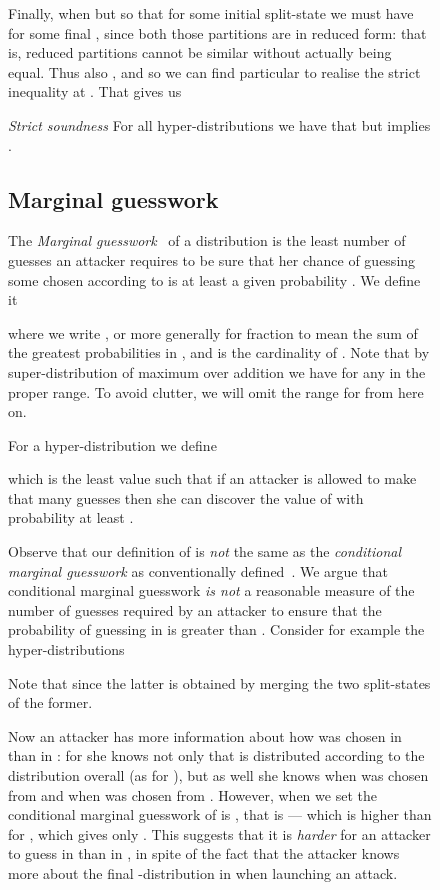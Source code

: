 \documentclass[runningheads]{llncs}
\newenvironment{Figure}[2][t]{\begin{figure}[#1]\def\Label{#2}\small}{\label{\Label}\end{figure}}
\newenvironment{Lemma}[2]{\begin{lemma}\label{#2}\textit{#1}\rm\quad}{\hfill\end{lemma}}
\begin{document}
\begin{Figure}[ht!]{f1228}
Finally, when  but  so that  for some initial split-state we must have  for some final , since both those partitions are in reduced form: that is, reduced partitions cannot be similar without actually being equal. Thus also , and so we can find particular  to realise the strict inequality at . That gives us
\begin{Lemma}{Strict soundness}{l2121}
For all hyper-distributions  we have that  but  implies .
\end{Lemma}


\subsection{Marginal guesswork}

The \emph{Marginal guesswork}~\cite{Pliam:00} of a distribution  is the least number of guesses an attacker requires to be sure that her chance of guessing some  chosen according to  is at least a given probability . We define it

where we write , or more generally  for fraction  to mean the sum of the  greatest probabilities in , and  is the cardinality of . Note that by super-distribution of maximum over addition we have  for any  in the proper range. To avoid clutter, we will omit the range  for  from here on.

For a hyper-distribution  we define

which is the least value  such that if an attacker is allowed to make that many guesses then she can discover the value of  with probability at least . 


Observe that our definition of  is \emph{not} the same as the \emph{conditional marginal guesswork}  as conventionally defined~\cite{Kopf:07}. We argue that conditional marginal guesswork \emph{is not} a reasonable measure of the number of guesses required by an attacker to ensure that the probability of guessing  in  is greater than . Consider for example the hyper-distributions

Note that  since the latter is obtained by merging the two split-states of the former.

Now an attacker has more information about how  was chosen in  than in : for  she knows not only that  is distributed according to the distribution  overall (as for ), but as well she knows when  was chosen from  and when  was chosen from . However, when we set  the conditional marginal guesswork of  is , that is  --- which is higher than for , which gives only . This suggests that it is \emph{harder} for an attacker to guess  in  than in , in spite of the fact that the attacker knows more about the final -distribution in  when launching an attack.



\end{Figure}
\end{document}
